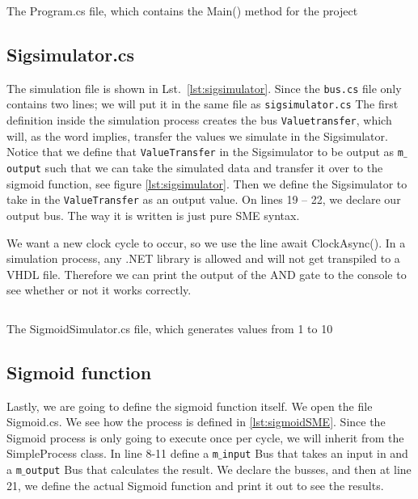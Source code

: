 \begin{listing}
  \inputminted{csharp}{codesnippets/Program.cs}
  \caption{The Program.cs file, which contains the Main() method for the project }
  \label{lst:program}

\end{listing}

\subsection{Sigsimulator.cs}

The simulation file is shown in Lst.~\ref{lst:sigsimulator}. Since the \texttt{bus.cs} file only contains two lines; we will put it in the same file as \texttt{sigsimulator.cs} The first definition inside the simulation process creates the bus \texttt{Valuetransfer}, which will, as the word implies, transfer the values we simulate in the Sigsimulator.
Notice that we define that \texttt{ValueTransfer} in the Sigsimulator to be output as \texttt{m$\_$output} such that we can take the simulated data and transfer it over to the sigmoid function, see figure \ref{lst:sigsimulator}.
Then we define the Sigsimulator to take in the \texttt{ValueTransfer} as an output value. On lines 19 – 22, we declare our output bus. The way it is written is just pure SME syntax.

We want a new clock cycle to occur, so we use the line await ClockAsync(). In a simulation process, any .NET library is allowed and will not get transpiled to a VHDL file.
Therefore we can print the output of the AND gate to the console to see whether or not it works
correctly.


\begin{listing}
  \inputminted{csharp}{codesnippets/SigmoidSimulator.cs}
  \caption{The SigmoidSimulator.cs file, which generates values from 1 to 10}
  \label{lst:sigsimulator}

\end{listing}


\subsection{Sigmoid function}
Lastly, we are going to define the sigmoid function itself. We open the file
Sigmoid.cs. We see how the process is defined in \ref{lst:sigmoidSME}. Since the Sigmoid process is only going to execute once per cycle, we will inherit from the SimpleProcess class. In line 8-11 define a \texttt{m$\_$input} Bus that takes an input in and a \texttt{m$\_$output} Bus that calculates the result. We declare the busses, and 
then at line 21, we define the actual Sigmoid function and print it out to see the results.

